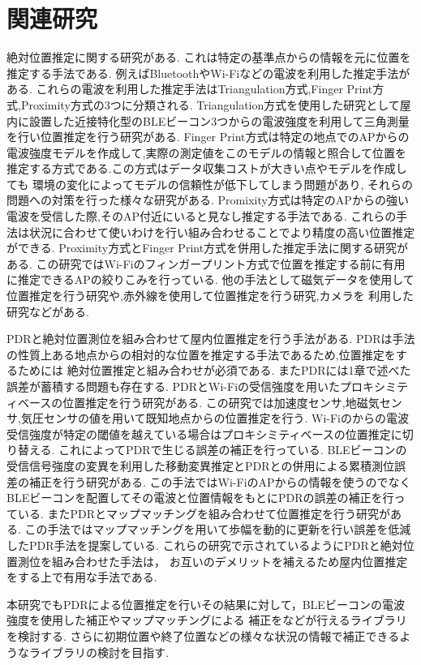 

\section{関連研究}
絶対位置推定に関する研究がある.
これは特定の基準点からの情報を元に位置を推定する手法である.
例えばBluetoothやWi-Fiなどの電波を利用した推定手法がある.
これらの電波を利用した推定手法はTriangulation方式,Finger Print方式,Proximity方式の3つに分類される.\cite{wireless-lan-summary}
Triangulation方式を使用した研究として屋内に設置した近接特化型のBLEビーコン3つからの電波強度を利用して三角測量を行い位置推定を行う研究がある.\cite{ble-indoor}\cite{ble-tandem}\cite{triangulation-kalman}
Finger Print方式は特定の地点でのAPからの電波強度モデルを作成して,実際の測定値をこのモデルの情報と照合して位置を推定する方式である.この方式はデータ収集コストが大きい点やモデルを作成しても
環境の変化によってモデルの信頼性が低下してしまう問題があり,
それらの問題への対策を行った様々な研究がある.\cite{gaussian-mixture-model}\cite{wireless-lan-cost-reduction}\cite{fingerprint-auto-update}\cite{wi-fi-fingerprint-domain}
Promixity方式は特定のAPからの強い電波を受信した際,そのAP付近にいると見なし推定する手法である.
これらの手法は状況に合わせて使いわけを行い組み合わせることでより精度の高い位置推定ができる.
Proximity方式とFinger Print方式を併用した推定手法に関する研究がある.\cite{proximity-fingerprint}
この研究ではWi-Fiのフィンガープリント方式で位置を推定する前に有用に推定できるAPの絞りこみを行っている.
他の手法として磁気データを使用して位置推定を行う研究\cite{pdr-mag}や,赤外線を使用して位置推定を行う研究\cite{infrared},カメラを
利用した研究\cite{camera}などがある.

PDRと絶対位置測位を組み合わせて屋内位置推定を行う手法がある.
PDRは手法の性質上ある地点からの相対的な位置を推定する手法であるため,位置推定をするためには
絶対位置推定と組み合わせが必須である.
またPDRには1章で述べた誤差が蓄積する問題も存在する.
PDRとWi-Fiの受信強度を用いたプロキシミティベースの位置推定を行う研究\cite{pdr-wifi}がある.
この研究では加速度センサ,地磁気センサ,気圧センサの値を用いて既知地点からの位置推定を行う.
Wi-Fiのからの電波受信強度が特定の閾値を越えている場合はプロキシミティベースの位置推定に切り替える.
これによってPDRで生じる誤差の補正を行っている.
BLEビーコンの受信信号強度の変異を利用した移動変異推定とPDRとの併用による累積測位誤差の補正を行う研究\cite{pdr-ble}がある.
この手法ではWi-FiのAPからの情報を使うのでなくBLEビーコンを配置してその電波と位置情報をもとにPDRの誤差の補正を行っている.
またPDRとマップマッチングを組み合わせて位置推定を行う研究\cite{pdr-map}がある.
この手法ではマップマッチングを用いて歩幅を動的に更新を行い誤差を低減したPDR手法を提案している.
これらの研究で示されているようにPDRと絶対位置測位を組み合わせた手法は，
お互いのデメリットを補えるため屋内位置推定をする上で有用な手法である.

本研究でもPDRによる位置推定を行いその結果に対して，BLEビーコンの電波強度を使用した補正やマップマッチングによる
補正をなどが行えるライブラリを検討する.
さらに初期位置や終了位置などの様々な状況の情報で補正できるようなライブラリの検討を目指す.










